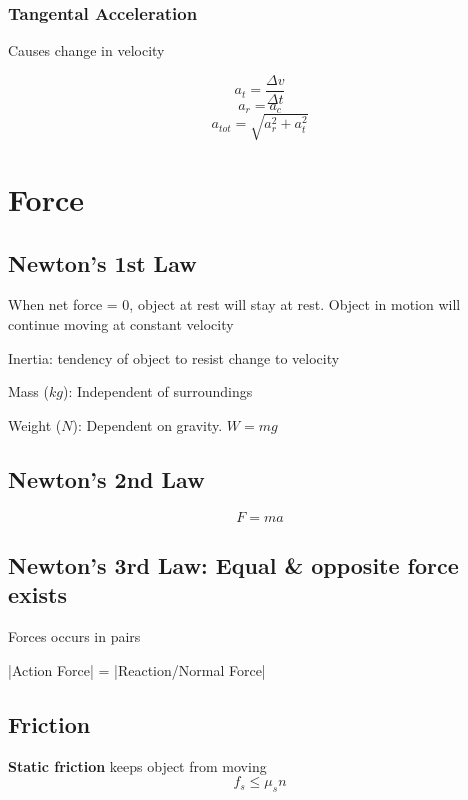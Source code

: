 \documentclass[12pt, twocolumn]{article}
\begin{document}
\begin{spacing}{1.5}
\subsubsection{Tangental Acceleration}

Causes change in velocity

$$a_t = \frac{\Delta v}{\Delta t}$$
$$a_r = a_c$$
$$a_{tot} = \sqrt{a_r^2 + a_t^2}$$

\section{Force}

\subsection{Newton's 1st Law}

When net force = 0, object at rest will stay at rest. Object in motion will continue moving at constant velocity

\begin{itemize*}
	\item Inertia: tendency of object to resist change to velocity
	\item Mass ($kg$): Independent of surroundings 
	\item Weight ($N$): Dependent on gravity. $W = mg$
\end{itemize*}

\subsection{Newton's 2nd Law}

$$F = ma$$

\subsection{Newton's 3rd Law: Equal \& opposite force exists}

\begin{itemize*}
	\item Forces occurs in pairs
	\item |Action Force| = |Reaction/Normal Force|
\end{itemize*}

\subsection{Friction}

\textbf{Static friction} keeps object from moving
$$f_s \le \mu_s n$$


\end{spacing}
\end{document}

